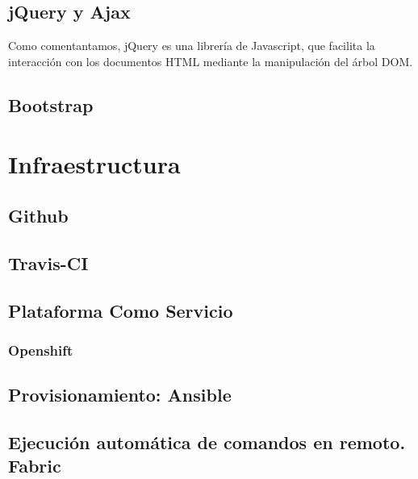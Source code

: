 \subsection{jQuery y Ajax}
Como comentantamos, jQuery \cite{jQuery} es una librería de Javascript, que facilita la interacción con los documentos HTML mediante la manipulación del árbol DOM.

\subsection{Bootstrap}

\section{Infraestructura}

\subsection{Github}

\subsection{Travis-CI}

\subsection{Plataforma Como Servicio}

\subsubsection{Openshift}

\subsection{Provisionamiento: Ansible}

\subsection{Ejecución automática de comandos en remoto. Fabric}

